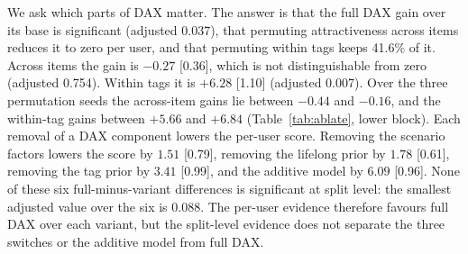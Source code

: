 \documentclass[preprint,12pt,authoryear]{elsarticle}
\begin{document}
We ask which parts of DAX matter. The answer is that the full DAX gain over its base is significant (adjusted 0.037), that permuting attractiveness across items reduces it to zero per user, and that permuting within tags keeps 41.6\% of it. Across items the gain is $-0.27$ [0.36], which is not distinguishable from zero (adjusted
0.754). Within tags it is $+6.28$ [1.10] (adjusted 0.007). Over the three permutation seeds the across-item gains lie between $-0.44$ and $-0.16$, and the
within-tag gains between $+5.66$ and $+6.84$ (Table~\ref{tab:ablate}, lower block). Each removal of a DAX component lowers the per-user score. Removing the scenario factors lowers the score by $1.51$ [0.79], removing the lifelong prior by $1.78$ [0.61], removing the tag prior by $3.41$ [0.99], and the additive model by $6.09$ [0.96]. None of these six full-minus-variant differences is significant at split level: the smallest adjusted value over the six is 0.088.
The per-user evidence therefore favours full DAX over each variant, but the split-level evidence does not separate the three switches or the additive
model from full DAX.
\end{document}
